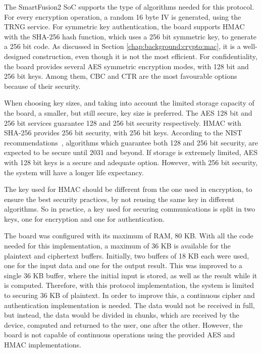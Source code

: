 The SmartFusion2 SoC supports the type of algorithms needed for this protocol.
For every encryption operation, a random 16 byte IV is generated, using the TRNG service.
For symmetric key authentication, the board supports HMAC with the SHA-256 hash function, which uses a 256 bit symmetric key, to generate a 256 bit code. As discussed in Section \ref{chap:background:crypto:mac}, it is a well-designed construction, even though it is not the most efficient.
For confidentiality, the board provides several AES symmetric encryption modes, with 128 bit and 256 bit keys. Among them, CBC and CTR are the most favourable options because of their security.

When choosing key sizes, and taking into account the limited storage capacity of the board, a smaller, but still secure, key size is preferred. The AES 128 bit and 256 bit services guarantee 128 and 256 bit security respectively. HMAC with SHA-256 provides 256 bit security, with 256 bit keys.
According to the NIST recommendations~\cite{nistRecommendations}, algorithms which guarantee both 128 and 256 bit security, are expected to be secure until 2031 and beyond. If storage is extremely limited, AES with 128 bit keys is a secure and adequate option. However, with 256 bit security, the system will have a longer life expectancy.

The key used for HMAC should be different from the one used in encryption, to ensure the best security practices, by not reusing the same key in different algorithms. So in practice, a key used for securing communications is split in two keys, one for encryption and one for authentication.

The board was configured with its maximum of RAM, 80 KB. With all the code needed for this implementation, a maximum of 36 KB is available for the plaintext and ciphertext buffers.
Initially, two buffers of 18 KB each were used, one for the input data and one for the output result. This was improved to a single 36 KB buffer, where the initial input is stored, as well as the result while it is computed.
Therefore, with this protocol implementation, the system is limited to securing 36 KB of plaintext.
In order to improve this, a continuous cipher and authentication implementation is needed. The data would not be received in full, but instead, the data would be divided in chunks, which are received by the device, computed and returned to the user, one after the other. However, the board is not capable of continuous operations using the provided AES and HMAC implementations.

